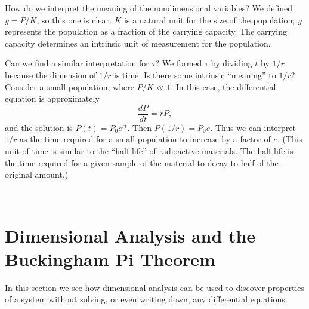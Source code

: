 \documentclass[reqno]{immbook}
\numberwithin{equation}{chapter}
\numberwithin{question}{section}
\numberwithin{theorem}{chapter}
\numberwithin{figure}{chapter}
\theoremstyle{definition}
\begin{document}
How do we interpret the meaning of the nondimensional
variables?  We defined $y=P/K$, so this one is clear.
$K$ is a natural unit for the size of the population;
$y$ represents the population as a fraction of the
carrying capacity.
The carrying capacity determines an intrinsic
unit of measurement for the population.

Can we find a similar interpretation for $\tau$? We
formed $\tau$ by dividing $t$ by $1/r$ because
the dimension of $1/r$ is time. Is there some
intrinsic ``meaning'' to $1/r$?  Consider
a small population, where $P/K \ll 1$.  In this
case, the differential equation is approximately
\[
   \frac{dP}{dt} = rP,
\]
and the solution is $P(t) = P_0 e^{rt}$.
Then $P(1/r) = P_0 e$.
Thus we can interpret $1/r$ as the time required
for a small population to increase by
a factor of $e$.  (This unit of time is similar
to the ``half-life'' of radioactive materials.
The half-life is the time required for a given sample
of the material to decay to half of the original
amount.)


\newpage

~

\newpage

\section{Dimensional Analysis and the Buckingham Pi Theorem}

In this section we see how dimensional analysis can be
used to discover properties of a system
without solving, or even  writing down,
any differential equations.
\end{document}

